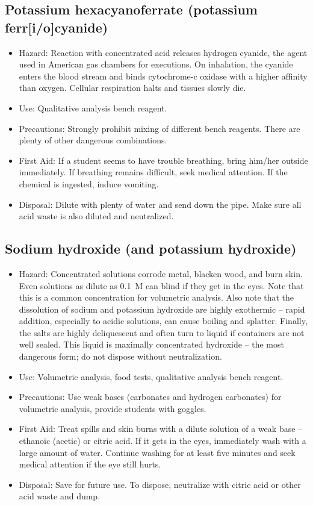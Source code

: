 \subsection{Potassium hexacyanoferrate (potassium ferr[i/o]cyanide)}
\begin{itemize}
\item{Hazard: Reaction with concentrated acid releases hydrogen cyanide, 
the agent used in American gas chambers for executions. 
On inhalation, the cyanide enters the blood stream 
and binds cytochrome-c oxidase with a higher affinity than oxygen. 
Cellular respiration halts and tissues slowly die.}
\item{Use: Qualitative analysis bench reagent.}
\item{Precautions: Strongly prohibit mixing of different bench reagents. 
There are plenty of other dangerous combinations.}
\item{First Aid: If a student seems to have trouble breathing, 
bring him/her outside immediately. 
If breathing remains difficult, seek medical attention. 
If the chemical is ingested, induce vomiting.}
\item{Disposal: Dilute with plenty of water and send down the pipe. 
Make sure all acid waste is also diluted and neutralized.}
\end{itemize}

\subsection{Sodium hydroxide (and potassium hydroxide)}
\begin{itemize}
\item{Hazard: Concentrated solutions corrode metal, 
blacken wood, and burn skin. 
Even solutions as dilute as 0.1~M can blind if they get in the eyes. 
Note that this is a common concentration for volumetric analysis. 
Also note that the dissolution of sodium and potassium hydroxide 
are highly exothermic -- rapid addition, especially to acidic solutions, 
can cause boiling and splatter. 
Finally, the salts are highly deliquescent 
and often turn to liquid if containers are not well sealed. 
This liquid is maximally concentrated hydroxide -- 
the most dangerous form; do not dispose without neutralization.}
\item{Use: Volumetric analysis, food tests, 
qualitative analysis bench reagent.}
\item{Precautions: Use weak bases (carbonates and hydrogen carbonates) 
for volumetric analysis, provide students with goggles.}
\item{First Aid: Treat spills and skin burns 
with a dilute solution of a weak base -- ethanoic (acetic) or citric acid. 
If it gets in the eyes, immediately wash with a large amount of water. 
Continue washing for at least five minutes 
and seek medical attention if the eye still hurts.}
\item{Disposal: Save for future use. 
To dispose, neutralize with citric acid or other acid waste and dump.}
\end{itemize}

